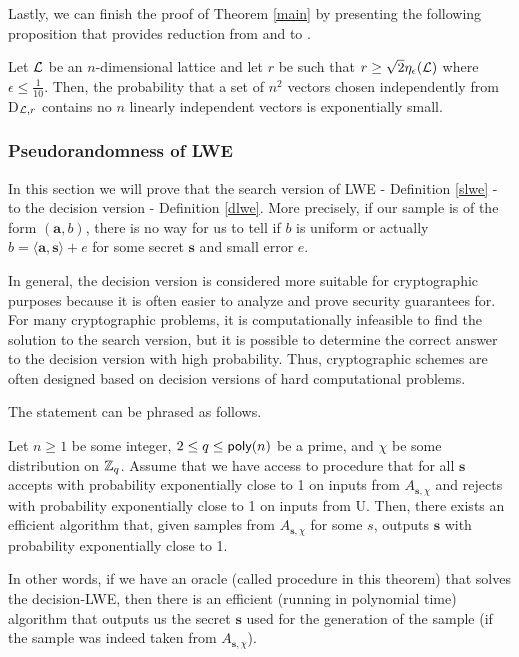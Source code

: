Lastly, we can finish the proof of Theorem \ref{main} by presenting the following proposition that provides reduction from  and  to .

\begin{proposition}
        Let $\mathcal{L}$ be an $n$-dimensional lattice and let $r$ be such that $r \geq \sqrt{2}\eta_{\epsilon}(\mathcal{L})$ where $\epsilon \leq \frac{1}{10}$. Then, the probability that a set of $n^2$ vectors chosen independently from D$_{\mathcal{L},r}$ contains no $n$ linearly independent vectors is exponentially small.
\end{proposition}

\subsubsection{Pseudorandomness of LWE}
In this section we will prove that the search version of LWE - Definition \ref{slwe} - to the decision version - Definition \ref{dlwe}. More precisely, if our sample is of the form $(\bm{a}, b)$, there is no way for us to tell if $b$ is uniform or actually $b = \langle \bm{a}, \bm{s} \rangle + e$ for some secret $\bm{s}$ and small error $e$.

In general, the decision version is considered more suitable for cryptographic purposes because it is often easier to analyze and prove security guarantees for. For many cryptographic problems, it is computationally infeasible to find the solution to the search version, but it is possible to determine the correct answer to the decision version with high probability. Thus, cryptographic schemes are often designed based on decision versions of hard computational problems.

The statement can be phrased as follows.
\begin{theorem}\label{s-to-d}
        Let $n \geq 1$ be some integer, $2 \leq q\leq \textsf{poly}(n)$ be a prime, and $\chi$ be some distribution on $\mathbb{Z}_q$. Assume that we have access to procedure  that for all $\bm{s}$ accepts with probability exponentially close to 1 on inputs from $A_{\bm{s},\chi}$ and rejects with probability exponentially close to 1 on inputs from U. Then, there exists an efficient algorithm  that, given samples from $A_{\bm{s},\chi}$ for some $s$, outputs $\bm{s}$ with probability exponentially close to 1.
\end{theorem}

In other words, if we have an oracle (called procedure in this theorem) that solves the decision-LWE, then there is an efficient (running in polynomial time) algorithm that outputs us the secret $\bm{s}$ used for the generation of the sample (if the sample was indeed taken from $A_{\bm{s}, \chi}$).

